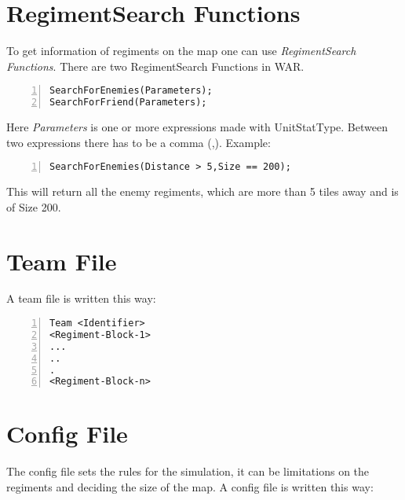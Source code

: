 \section{RegimentSearch Functions}
	To get information of regiments on the map one can use {\it RegimentSearch Functions}. There are two RegimentSearch Functions in WAR.\\

		\begin{lstlisting}[basicstyle=\small\sffamily,
		keywordstyle={\color{blue}},
		comment={[l]{//}}, morecomment={[s]{/*}{*/}}, commentstyle=\itshape,
		columns={[l]flexible}, numbers=left, numberstyle=\tiny,
		frameround=fftt, frame=shadowbox, captionpos=b,
		caption={Regiment Assignment},
		label=RegimentAssignment]
SearchForEnemies(Parameters);
SearchForFriend(Parameters);
	\end{lstlisting}
	Here {\it Parameters} is one or more expressions made with UnitStatType. Between two expressions there has to be a comma (,).
	Example: \\

		\begin{lstlisting}[basicstyle=\small\sffamily,
		keywordstyle={\color{blue}},
		comment={[l]{//}}, morecomment={[s]{/*}{*/}}, commentstyle=\itshape,
		columns={[l]flexible}, numbers=left, numberstyle=\tiny,
		frameround=fftt, frame=shadowbox, captionpos=b,
		caption={Regiment Assignment},
		label=RegimentAssignment]
SearchForEnemies(Distance > 5,Size == 200);
	\end{lstlisting}
	This will return all the enemy regiments, which are more than 5 tiles away and is of Size 200.		
\section{Team File}
\label{doc:teamfile}
	A team file is written this way: \\

		\begin{lstlisting}[basicstyle=\small\sffamily,
		keywordstyle={\color{blue}},
		comment={[l]{//}}, morecomment={[s]{/*}{*/}}, commentstyle=\itshape,
		columns={[l]flexible}, numbers=left, numberstyle=\tiny,
		frameround=fftt, frame=shadowbox, captionpos=b,
		caption={Regiment Assignment},
		label=RegimentAssignment]
Team <Identifier>
<Regiment-Block-1>
...
..
.
<Regiment-Block-n>
		\end{lstlisting}
	
\section{Config File}
\label{doc:cfgfile}
	The config file sets the rules for the simulation, it can be limitations on the regiments and deciding the size of the map.
	A config file is written this way: \\

